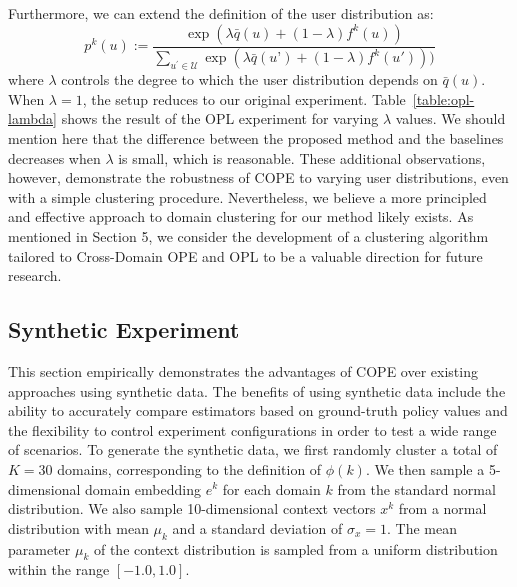 Furthermore, we can extend the definition of the user distribution as:  
$$ p^{k}(u):=\frac{\exp (\lambda \bar{q}(u) + (1-\lambda) f^k(u))}{\sum_{u^{\prime} \in \mathcal{U}} \exp (\lambda \bar{q}(u’) + (1-\lambda) f^k(u')))} $$
where $\lambda$ controls the degree to which the user distribution depends on $\bar{q}(u)$. When $\lambda = 1$, the setup reduces to our original experiment. Table~\ref{table:opl-lambda} shows the result of the OPL experiment for varying $\lambda$ values. We should mention here that the difference between the proposed method and the baselines decreases when $\lambda$ is small, which is reasonable. These additional observations, however, demonstrate the robustness of COPE to varying user distributions, even with a simple clustering procedure. Nevertheless, we believe a more principled and effective approach to domain clustering for our method likely exists. As mentioned in Section 5, we consider the development of a clustering algorithm tailored to Cross-Domain OPE and OPL to be a valuable direction for future research.




\subsection{Synthetic Experiment} \label{app:synthetic}
This section empirically demonstrates the advantages of COPE over existing approaches using synthetic data. The benefits of using synthetic data include the ability to accurately compare estimators based on ground-truth policy values and the flexibility to control experiment configurations in order to test a wide range of scenarios. To generate the synthetic data, we first randomly cluster a total of $K=30$ domains, corresponding to the definition of $\phi(k)$. We then sample a 5-dimensional domain embedding $e^{k}$ for each domain $k$ from the standard normal distribution. We also sample 10-dimensional context vectors $x^{k}$ from a normal distribution with mean $\mu_{k}$ and a standard deviation of $\sigma_x = 1$. The mean parameter $\mu_{k}$ of the context distribution is sampled from a uniform distribution within the range $[-1.0,1.0]$.

